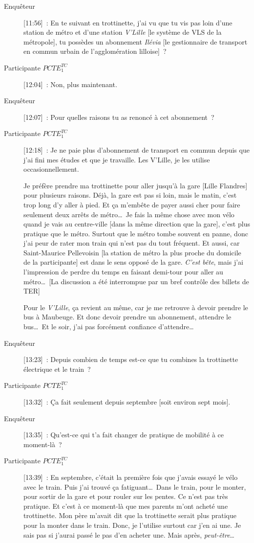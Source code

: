 \begin{description}
    \item[Enquêteur] [11:56]~: En te suivant en trottinette, j'ai vu que tu vis pas loin d'une station de métro et d'une station \textsl{V'Lille} [le système de VLS de la métropole], tu possèdes un abonnement \textsl{Ilévia} [le gestionnaire de transport en commun urbain de l'agglomération lilloise]~?
    \item[Participante \(PCTE^{TC}_{1}\)] [12:04]~: Non, plus maintenant.
    \item[Enquêteur] [12:07]~: Pour quelles raisons tu as renoncé à cet abonnement~?
    \item[Participante \(PCTE^{TC}_{1}\)] [12:18]~: Je ne paie plus d'abonnement de transport en commun depuis que j'ai fini mes études et que je travaille. Les V'Lille, je les utilise occasionnellement.%
    
    Je préfère prendre ma trottinette pour aller jusqu'à la gare [Lille Flandres] pour plusieurs raisons. Déjà, la gare est pas si loin, mais le matin, c'est trop long d'y aller à pied. Et ça m'embête de payer aussi cher pour faire seulement deux arrêts de métro\dots~Je fais la même chose avec mon vélo quand je vais au centre-ville [dans la même direction que la gare], c'est plus pratique que le métro. Surtout que le métro tombe souvent en panne, donc j'ai peur de rater mon train qui n'est pas du tout fréquent. Et aussi, car Saint-Maurice Pellevoisin [la station de métro la plus proche du domicile de la participante] est dans le sens opposé de la gare. \textsl{C'est bête}, mais j'ai l'impression de perdre du temps en faisant demi-tour pour aller au métro\dots~[La discussion a été interrompue par un bref contrôle des billets de TER]%

    Pour le \textsl{V'Lille}, ça revient au même, car je me retrouve à devoir prendre le bus à Maubeuge. Et donc devoir prendre un abonnement, attendre le bus\dots~Et le soir, j'ai pas forcément confiance d'attendre\dots
    \item[Enquêteur] [13:23]~: Depuis combien de temps est-ce que tu combines la trottinette électrique et le train~?
    \item[Participante \(PCTE^{TC}_{1}\)] [13:32]~: Ça fait seulement depuis septembre [soit environ sept mois].
    \item[Enquêteur] [13:35]~: Qu'est-ce qui t'a fait changer de pratique de mobilité à ce moment-là~?
    \item[Participante \(PCTE^{TC}_{1}\)] [13:39]~: En septembre, c’était la première fois que j’avais essayé le vélo avec le train. Puis j’ai trouvé ça fatiguant\dots~Dans le train, pour le monter, pour sortir de la gare et pour rouler sur les pentes. Ce n’est pas très pratique. Et c’est à ce moment-là que mes parents m’ont acheté une trottinette. Mon père m’avait dit que la trottinette serait plus pratique pour la monter dans le train. Donc, je l’utilise surtout car j’en ai une. Je sais pas si j’aurai passé le pas d’en acheter une. Mais après, \textsl{peut-être}\dots%


\end{description}
